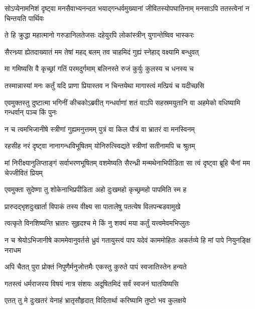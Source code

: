 \threelineshloka
{सोऽप्येनामनिशं दृष्ट्वा मनसैवाभ्यनन्दत}
{भयाद्गन्धर्वमुख्यानां जीवितस्योपघातिनाम्}
{मनसाऽपि ततस्त्वेनां न चिन्तयति पार्थिवः}


\twolineshloka
{ते हि क्रुद्धा महात्मानो गरुडानिलतेजसः}
{दहेयुरपि लोकांस्त्रीन् युगान्तेष्विव भास्करः}


\twolineshloka
{सैरन्ध्र्या ह्येतदाख्यातं मम तेषां महद् बलम्}
{तव चाहमिदं गुह्यं स्नेहाद् वक्ष्यामि बन्धुवत्}


\twolineshloka
{मा गमिष्यसि वै कृच्छ्रां गतिं परमदुर्गमाम्}
{बलिनस्ते रुजं कुर्युः कुलस्य च धनस्य च}


\twolineshloka
{तस्मान्नास्यां मनः कर्तुं यदि प्राणा प्रियास्तव}
{न चिन्तयेथा मागास्त्वं मत्प्रियं च यदीच्छसि}



\threelineshloka
{एवमुक्तस्तु दुष्टात्मा भगिनीं कीचकोऽब्रवीत्}
{गन्धर्वाणां शतं वाऽपि सहस्रमयुतानि वा}
{अहमेको वधिष्यामि गन्धर्वान् पञ्च किं पुनः}


\twolineshloka
{न च त्वमभिजानीषे स्त्रीणां गुह्यमनुत्तमम्}
{पुत्रं वा किल पौत्रं वा भ्रातरं वा मनस्विनम्}


\twolineshloka
{रहसीह नरं दृष्ट्वा नानागन्धविभूषितम्}
{योनिरुत्स्विद्यते स्त्रीणां सतीनामपि च श्रुतम्}


\threelineshloka
{मां निरीक्ष्यानुलिप्ताङ्गं सर्वाभरणभूषितम्}
{वशमेष्यति सैरन्ध्री मन्मथेनाभिपीडिता}
{सा त्वं दृष्ट्वा ब्रूहि चैनां मम चेज्जीवितं प्रियम्}



\twolineshloka
{एवमुक्ता सुदेष्णा तु शोकेनाभिप्रपीडिता}
{अहो दुःखमहो कृच्छ्रमहो पापमिति स्म ह}


\twolineshloka
{प्रारुदद्भृशदुःखार्ता विपाकं तस्य वीक्ष्य सा}
{पातालेषु पतत्येष विलपन्बडवामुखे}


\twolineshloka
{त्वत्कृते विनशिष्यन्ति भ्रातरः सुहृदश्च मे}
{किं नु शक्यं मया कर्तुं यत्त्वमेवमभिप्लुतः}


\threelineshloka
{न च श्रेयोऽभिजानीषे काममेवानुवर्तसे}
{ध्रुवं गतायुस्त्वं पाप यदेवं काममोहितः}
{अकर्तव्ये हि मां पापे नियुनङ्क्षि नराधम}


\twolineshloka
{अपि चैतत् पुरा प्रोक्तं निपुणैर्मनुजोत्तमैः}
{एकस्तु कुरुते पापं स्वजातिस्तेन हन्यते}


\twolineshloka
{गतस्त्वं धर्मराजस्य विषयं नात्र संशयः}
{अदूषितमिदं सर्वं स्वजनं घातयिष्यसि}


\twolineshloka
{एतत् तु मे दुःखतरं येनाहं भ्रातृसौहृदात्}
{विदितार्था करिष्यामि तुष्टो भव कुलक्षये}


